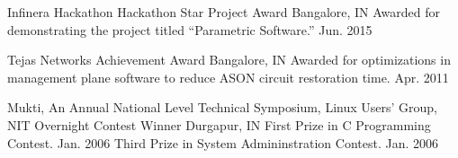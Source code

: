 \begin{cventries}
  \honorentry
    {Infinera Hackathon} %
    {Hackathon Star Project Award} %
    {Bangalore, IN}
    {
	\honorsubentry
	  {Awarded for demonstrating the project titled ``Parametric Software.''} %
	  {Jun. 2015} %
    }

  \honorentry
    {Tejas Networks} %
    {Achievement Award} %
    {Bangalore, IN}
    {
	\honorsubentry
	  {Awarded for optimizations in management plane software to reduce ASON circuit restoration time.} %
	  {Apr. 2011} %
    }

  \honorentry
    {Mukti, An Annual National Level Technical Symposium, Linux Users' Group, NIT} %
    {Overnight Contest Winner} %
    {Durgapur, IN}
    {
	\honorsubentry
	  {First Prize in C Programming Contest.}
	  {Jan. 2006} %
	\honorsubentry
	  {Third Prize in System Admininstration Contest.}
	  {Jan. 2006} %
    }


\end{cventries}


